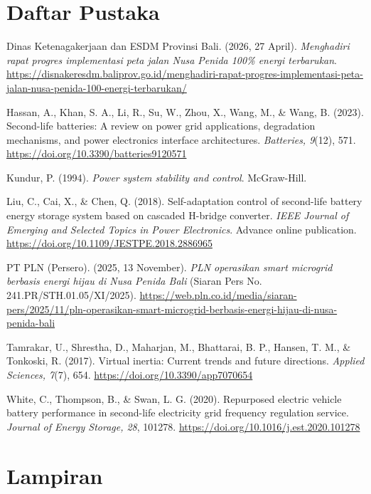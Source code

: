 \documentclass[12pt,a4paper,twocolumn]{article}
\begin{document}
\section{Daftar Pustaka}
{\raggedright\setlength{\parindent}{0pt}

Dinas Ketenagakerjaan dan ESDM Provinsi Bali. (2026, 27 April). \textit{Menghadiri rapat progres implementasi peta jalan Nusa Penida 100\% energi terbarukan}. \url{https://disnakeresdm.baliprov.go.id/menghadiri-rapat-progres-implementasi-peta-jalan-nusa-penida-100-energi-terbarukan/}

Hassan, A., Khan, S. A., Li, R., Su, W., Zhou, X., Wang, M., \& Wang, B. (2023). Second-life batteries: A review on power grid applications, degradation mechanisms, and power electronics interface architectures. \textit{Batteries, 9}(12), 571. \url{https://doi.org/10.3390/batteries9120571}

Kundur, P. (1994). \textit{Power system stability and control}. McGraw-Hill.

Liu, C., Cai, X., \& Chen, Q. (2018). Self-adaptation control of second-life battery energy storage system based on cascaded H-bridge converter. \textit{IEEE Journal of Emerging and Selected Topics in Power Electronics}. Advance online publication. \url{https://doi.org/10.1109/JESTPE.2018.2886965}

PT PLN (Persero). (2025, 13 November). \textit{PLN operasikan smart microgrid berbasis energi hijau di Nusa Penida Bali} (Siaran Pers No. 241.PR/STH.01.05/XI/2025). \url{https://web.pln.co.id/media/siaran-pers/2025/11/pln-operasikan-smart-microgrid-berbasis-energi-hijau-di-nusa-penida-bali}

Tamrakar, U., Shrestha, D., Maharjan, M., Bhattarai, B. P., Hansen, T. M., \& Tonkoski, R. (2017). Virtual inertia: Current trends and future directions. \textit{Applied Sciences, 7}(7), 654. \url{https://doi.org/10.3390/app7070654}

White, C., Thompson, B., \& Swan, L. G. (2020). Repurposed electric vehicle battery performance in second-life electricity grid frequency regulation service. \textit{Journal of Energy Storage, 28}, 101278. \url{https://doi.org/10.1016/j.est.2020.101278}
\par}

\onecolumn
\section*{Lampiran}
\end{document}
